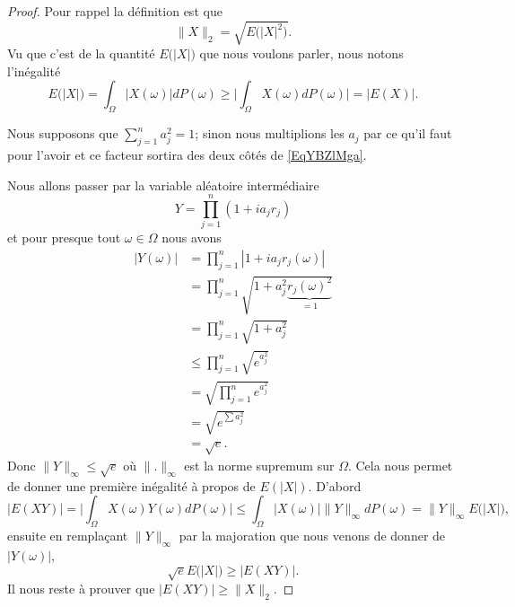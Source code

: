 \begin{proof}
	Pour rappel la définition est que
	\begin{equation}
		\| X \|_2=\sqrt{  E\big( | X |^2 \big)}.
	\end{equation}
	Vu que c'est de la quantité \( E\big( | X | \big)\) que nous voulons parler, nous notons l'inégalité
	\begin{equation}
		E\big( | X | \big)=\int_{\Omega}\big| X(\omega) \big|dP(\omega)\geq \big| \int_{\Omega}X(\omega)dP(\omega) \big|=\big| E(X) \big|.
	\end{equation}

	Nous supposons que \( \sum_{j=1}^na_j^2=1\); sinon nous multiplions les \(a_j\) par ce qu'il faut pour l'avoir et ce facteur sortira des deux côtés de \eqref{EqYBZlMga}.

	Nous allons passer par la variable aléatoire intermédiaire
	\begin{equation}
		Y=\prod_{j=1}^n(1+ia_jr_j)
	\end{equation}
	et pour presque tout \( \omega\in \Omega\) nous avons
	\begin{subequations}
		\begin{align}
			| Y(\omega) | & =\prod_{j=1}^n| 1+ia_jr_j(\omega) |                         \\
			              & =\prod_{j=1}^n\sqrt{1+a^2_j\underbrace{r_j(\omega)^2}_{=1}} \\
			              & =\prod_{j=1}^n\sqrt{1+a_j^2 }                               \\
			              & \leq\prod_{j=1}^n\sqrt{  e^{a_j^2} }                        \\
			              & =\sqrt{\prod_{j=1}^n e^{a_j^2}}                             \\
			              & =\sqrt{ e^{\sum a_j^2}}                                     \\
			              & =\sqrt{e}.
		\end{align}
	\end{subequations}
	Donc \( \| Y \|_{\infty}\leq \sqrt{e}\) où \( \| . \|_{\infty}\) est la norme supremum sur \( \Omega\). Cela nous permet de donner une première inégalité à propos de \( E(| X |)\). D'abord
	\begin{equation}
		\big| E(XY) \big|=\big| \int_{\Omega}X(\omega)Y(\omega)dP(\omega) \big|\leq \int_{\Omega}\big| X(\omega) \big|\| Y \|_{\infty}dP(\omega)=\| Y \|_{\infty}E\big( | X | \big),
	\end{equation}
	ensuite en remplaçant \( \| Y \|_{\infty}\) par la majoration que nous venons de donner de \( | Y(\omega) |\),
	\begin{equation} \label{EqYVbzyGb}
		\sqrt{e}E\big( | X | \big)\geq \big| E(XY) \big|.
	\end{equation}
	Il nous reste à prouver que \( \big| E(XY) \big|\geq \| X \|_2\).


\end{proof}

